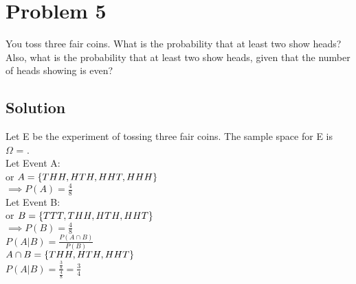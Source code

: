 \section{Problem 5}
You toss three fair coins. What is the probability that at least two show heads? Also, what is the probability that at least two show heads, given that the number of heads showing is even?

\subsection{Solution}
Let E be the experiment of tossing three fair coins.
The sample space for E is\\
 $\Omega$ = .\\
Let Event A:  \\
or $A = \{THH, HTH, HHT, HHH\}$\\[5pt]
$\implies P(A) = \frac{4}{8}$ \\[5pt]
Let Event B:  \\
or $B = \{TTT, THH, HTH, HHT\}$ \\[5pt]
$\implies P(B) = \frac{4}{8}$ \\[5pt]
$P(A|B) = \frac{P(A \cap B)}{P(B)}$\\
$A \cap B = \{THH, HTH, HHT\}$ \\[5pt]
$P(A|B) = \frac{\frac{3}{8}}{\frac{4}{8}} = \frac{3}{4}$ 